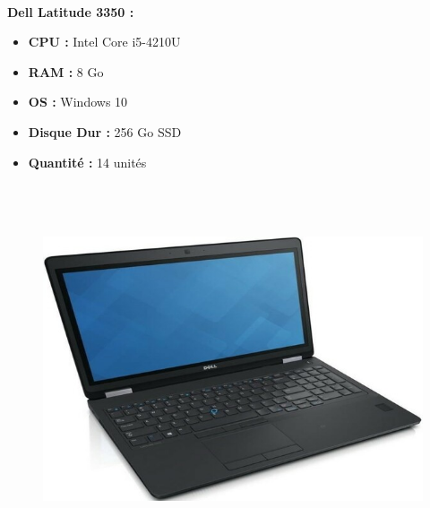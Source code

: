 \documentclass[11pt,a4paper,oneside]{article}
\begin{document}
\paragraph{}\textbf{Dell Latitude 3350 :} \\
\begin{itemize}
\item \textbf{CPU :} Intel Core i5-4210U
\item \textbf{RAM :} 8 Go
\item \textbf{OS :} Windows 10
\item \textbf{Disque Dur :} 256 Go SSD
\item \textbf{Quantité :} 14 unités
\\ \\ \\ \\
\end{itemize}
\begin{figure}
\includegraphics[scale=0.4]{Ressources/Materiel/LE5570.jpg}\vspace{-2cm}
\end{figure}
\end{document}
